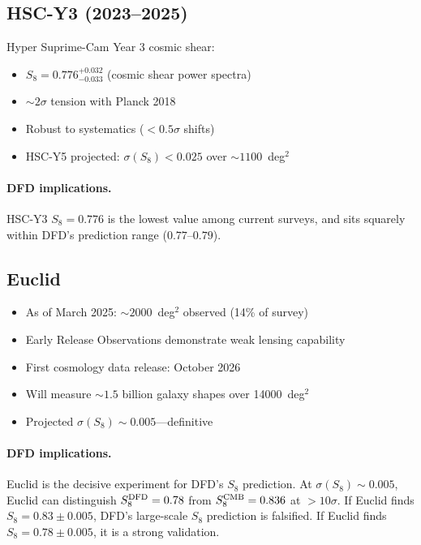 \documentclass[11pt,a4paper]{article}
\begin{document}
\subsection{HSC-Y3 (2023--2025)}

Hyper Suprime-Cam Year 3 cosmic shear:
\begin{itemize}
\item $S_8 = 0.776^{+0.032}_{-0.033}$ (cosmic shear power spectra)
\item $\sim 2\sigma$ tension with Planck 2018
\item Robust to systematics ($< 0.5\sigma$ shifts)
\item HSC-Y5 projected: $\sigma(S_8) < 0.025$ over $\sim 1100$~deg$^2$
\end{itemize}

\paragraph{DFD implications.}
HSC-Y3 $S_8 = 0.776$ is the lowest value among current surveys, and sits
squarely within DFD's prediction range ($0.77$--$0.79$).

\subsection{Euclid}

\begin{itemize}
\item As of March 2025: $\sim 2000$~deg$^2$ observed (14\% of survey)
\item Early Release Observations demonstrate weak lensing capability
\item First cosmology data release: October 2026
\item Will measure $\sim 1.5$ billion galaxy shapes over 14000~deg$^2$
\item Projected $\sigma(S_8) \sim 0.005$---definitive
\end{itemize}

\paragraph{DFD implications.}
Euclid is the decisive experiment for DFD's $S_8$ prediction.  At
$\sigma(S_8) \sim 0.005$, Euclid can distinguish $S_8^{\rm DFD} = 0.78$
from $S_8^{\rm CMB} = 0.836$ at $> 10\sigma$.  If Euclid finds
$S_8 = 0.83 \pm 0.005$, DFD's large-scale $S_8$ prediction is falsified.
If Euclid finds $S_8 = 0.78 \pm 0.005$, it is a strong validation.
\end{document}

